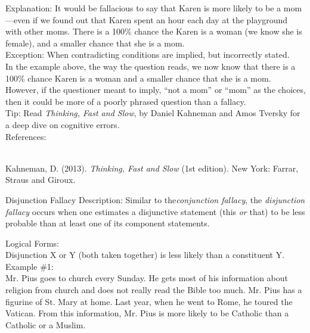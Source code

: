\documentclass[a4paper,12pt,single,pdftex]{scrartcl}
\begin{document}
    
      Explanation: It would be fallacious to say that Karen is more likely to be a mom—even if we found out that Karen spent an hour each day at the playground with other moms. There is a 100\% chance the Karen is a woman (we know she is female), and a smaller chance that she is a mom.
    \\

    
      Exception: When contradicting conditions are implied, but incorrectly stated.
    \\

    
      In the example above, the way the question reads, we now know that there is a 100\% chance Karen is a woman and a smaller chance that she is a mom. However, if the questioner meant to imply, “not a mom” or “mom” as the choices, then it could be more of a poorly phrased question than a fallacy.
    \\

    
      Tip: Read {\em Thinking, Fast and Slow}, by Daniel Kahneman and Amos Tversky for a deep dive on cognitive errors.
    \\

    References:

    
      
        
      \\

      
        
          Kahneman, D. (2013). {\it Thinking, Fast and Slow} (1st edition). New York: Farrar, Straus and Giroux.
        
      
    
  

Disjunction Fallacy
    Description: Similar to the{\em  {\it conjunction fallacy}}, the {\em disjunction fallacy} occurs when one estimates a disjunctive statement (this {\em or} that) to be less probable than at least one of its component statements.

    
      Logical Forms:
    \\

    
      Disjunction X or Y (both taken together) is less likely than a constituent Y.
    \\

    
      Example \#1:
    \\

    
      Mr. Pius goes to church every Sunday.  He gets most of his information about religion from church and does not really read the Bible too much.  Mr. Pius has a figurine of St. Mary at home.  Last year, when he went to Rome, he toured the Vatican.  From this information, Mr. Pius is more likely to be Catholic than a Catholic or a Muslim.
    \\
\end{document}
